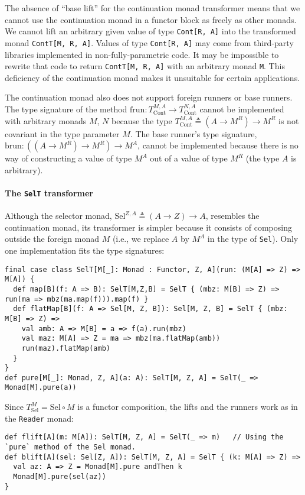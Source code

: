 The absence of \textsf{``}base lift\textsf{''} for the continuation monad transformer
means that we cannot use the continuation monad in a functor block
as freely as other monads. We cannot lift an arbitrary given value
of type \lstinline!Cont[R, A]! into the transformed monad \lstinline!ContT[M, R, A]!.
Values of type \lstinline!Cont[R, A]! may come from third-party libraries
implemented in non-fully-parametric code. It may be impossible to
rewrite that code to return \lstinline!ContT[M, R, A]! with an arbitrary
monad \lstinline!M!. This deficiency of the continuation monad makes
it unsuitable for certain applications. 

The continuation monad also does not support foreign runners or base
runners. The type signature of the method $\text{frun}:T_{\text{Cont}}^{M,A}\rightarrow T_{\text{Cont}}^{N,A}$
cannot be implemented with arbitrary monads $M$, $N$ because the
type $T_{\text{Cont}}^{M,A}\triangleq(A\rightarrow M^{R})\rightarrow M^{R}$
is not covariant in the type parameter $M$. The base runner\textsf{'}s type
signature, $\text{brun}:((A\rightarrow M^{R})\rightarrow M^{R})\rightarrow M^{A}$,
cannot be implemented because there is no way of constructing a value
of type $M^{A}$ out of a value of type $M^{R}$ (the type $A$ is
arbitrary).

\paragraph{The \texttt{SelT} transformer}

Although the selector monad, $\text{Sel}^{Z,A}\triangleq\left(A\rightarrow Z\right)\rightarrow A$,
resembles the continuation monad, its transformer is simpler because
it consists of composing outside the foreign monad $M$ (i.e., we
replace $A$ by $M^{A}$ in the type of \lstinline!Sel!). Only one
implementation fits the type signatures:
\begin{lstlisting}
final case class SelT[M[_]: Monad : Functor, Z, A](run: (M[A] => Z) => M[A]) {
  def map[B](f: A => B): SelT[M,Z,B] = SelT { (mbz: M[B] => Z) => run(ma => mbz(ma.map(f))).map(f) }
  def flatMap[B](f: A => Sel[M, Z, B]): Sel[M, Z, B] = SelT { (mbz: M[B] => Z) =>
    val amb: A => M[B] = a => f(a).run(mbz)
    val maz: M[A] => Z = ma => mbz(ma.flatMap(amb))
    run(maz).flatMap(amb)
  }
}
def pure[M[_]: Monad, Z, A](a: A): SelT[M, Z, A] = SelT(_ => Monad[M].pure(a))
\end{lstlisting}
Since $T_{\text{Sel}}^{M}=\text{Sel}\circ M$ is a functor composition,
the lifts and the runners work as in the \lstinline!Reader! monad:
\begin{lstlisting}
def flift[A](m: M[A]): SelT[M, Z, A] = SelT(_ => m)   // Using the `pure` method of the Sel monad.
def blift[A](sel: Sel[Z, A]): SelT[M, Z, A] = SelT { (k: M[A] => Z) =>
  val az: A => Z = Monad[M].pure andThen k
  Monad[M].pure(sel(az))
}
\end{lstlisting}


